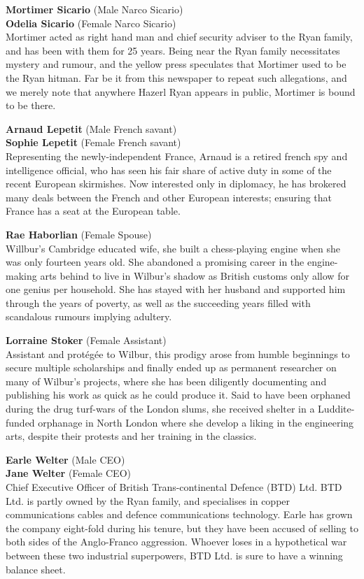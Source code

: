 \textbf{Mortimer Sicario} (Male Narco Sicario)\\
\textbf{Odelia Sicario} (Female Narco Sicario)\\
Mortimer acted as right hand man and chief security adviser to the Ryan
family, and has been with them for 25 years. Being near the Ryan family
necessitates mystery and rumour, and the yellow press speculates that
Mortimer used to be the Ryan hitman. Far be it from this newspaper to
repeat such allegations, and we merely note that anywhere Hazerl Ryan
appears in public, Mortimer is bound to be there.

\textbf{Arnaud Lepetit} (Male French savant)\\
\textbf{Sophie Lepetit} (Female French savant)\\
Representing the newly-independent France, Arnaud is a retired french
spy and intelligence official, who has seen his fair share of active
duty in some of the recent European skirmishes. Now interested only in
diplomacy, he has brokered many deals between the French and other
European interests; ensuring that France has a seat at the European
table.

\textbf{Rae Haborlian} (Female Spouse)\\
Willbur's Cambridge educated wife, she built a chess-playing engine when
she was only fourteen years old. She abandoned a promising career in the
engine-making arts behind to live in Wilbur's shadow as British customs
only allow for one genius per household. She has stayed with her husband
and supported him through the years of poverty, as well as the
succeeding years filled with scandalous rumours implying adultery.

\textbf{Lorraine Stoker} (Female Assistant)\\
Assistant and protégée to Wilbur, this prodigy arose from humble
beginnings to secure multiple scholarships and finally ended up as
permanent researcher on many of Wilbur's projects, where she has been
diligently documenting and publishing his work as quick as he could
produce it. Said to have been orphaned during the drug turf-wars of the
London slums, she received shelter in a Luddite-funded orphanage in
North London where she develop a liking in the engineering arts, despite
their protests and her training in the classics.

\textbf{Earle Welter} (Male CEO)\\
\textbf{Jane Welter} (Female CEO)\\
Chief Executive Officer of British Trans-continental Defence (BTD) Ltd.
BTD Ltd. is partly owned by the Ryan family, and specialises in copper
communications cables and defence communications technology. Earle has
grown the company eight-fold during his tenure, but they have been
accused of selling to both sides of the Anglo-Franco aggression. Whoever
loses in a hypothetical war between these two industrial superpowers,
BTD Ltd. is sure to have a winning balance sheet.

